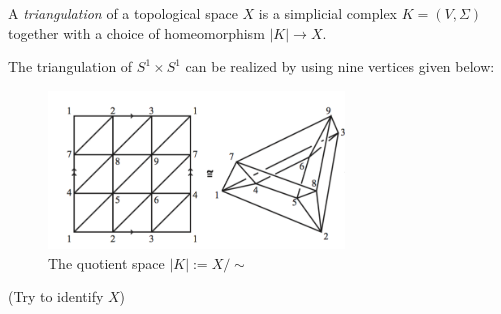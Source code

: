 \begin{definition}[Triangulation]
A \emph{triangulation} of a topological space $X$ is a simplicial complex $K=(V,\Sigma)$ together with a choice of homeomorphism $|K|\to X$.
\end{definition}

\begin{example}
The triangulation of $S^1\times S^1$ can be realized by using nine vertices given below:
\begin{figure}[H]
\centering
\includegraphics[width=0.7\textwidth]{week7/p_8}
\caption{The quotient space $|K|:=X/\sim$}
\end{figure}
(Try to identify $X$)
\end{example}



















